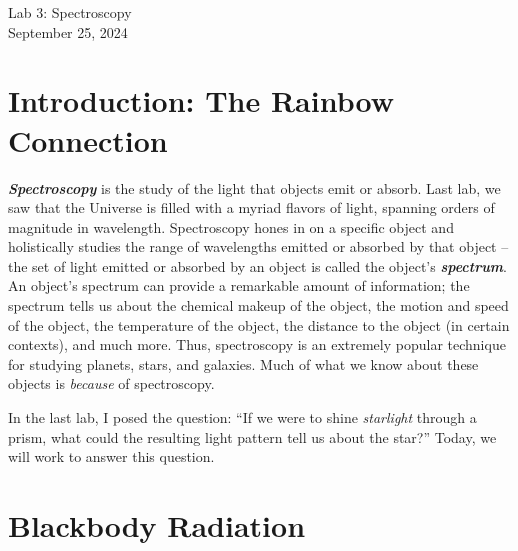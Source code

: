 \documentclass[11pt]{article}
\begin{document}
\begin{center}
\huge{Lab 3: Spectroscopy}\\ \medskip \Large{September 25, 2024}
\end{center}

\section{Introduction: The Rainbow Connection}

\textbf{\emph{Spectroscopy}} is the study of the light that objects emit or absorb. Last lab, we saw that the Universe is filled with a myriad flavors of light, spanning orders of magnitude in wavelength. Spectroscopy hones in on a specific object and holistically studies the range of wavelengths emitted or absorbed by that object -- the set of light emitted or absorbed by an object is called the object's \textbf{\emph{spectrum}}. An object's spectrum can provide a remarkable amount of information; the spectrum tells us about the chemical makeup of the object, the motion and speed of the object, the temperature of the object, the distance to the object (in certain contexts), and much more. Thus, spectroscopy is an extremely popular technique for studying planets, stars, and galaxies. Much of what we know about these objects is \emph{because} of spectroscopy.


In the last lab, I posed the question: ``If we were to shine \emph{starlight} through a prism, what could the resulting light pattern tell us about the star?'' Today, we will work to answer this question.

\section{Blackbody Radiation}
\end{document}
